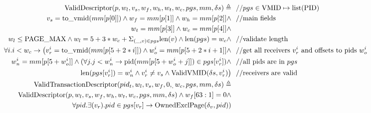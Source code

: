 \documentclass[a4paper]{article}
\newcommand*{\defined}{\triangleq}
\newcommand*{\PID}{\text{PID}}
\newcommand*{\VMID}{\text{VMID}}
\newcommand*{\PPMAX}{\text{PAGE\_MAX}}
\begin{document}
\clearpage

\begin{align*}
  \text{ValidDescriptor}(p,w_l,v_s,w_f,w_h,w_t,w_c,pgs,mm,\delta s)\defined &~~//pgs \in \VMID \mapsto \text{list}(\PID)\\
  v_{s}=\tv{mm[p[0]]} \land w_{f}=mm[p[1]] \land w_{h}=mm[p[2]] \land &~~//\text{main fields}\\
   w_{t} = mm[p[3]] \land w_{c} = mm[p[4]] \land &~~ \\
  w_l \le \PPMAX \land w_{l} = 5+3*w_{c} + \Sigma_{(\_,v)\in pgs} \text{len}(v) \land \text{len}(pgs)=w_{c} \land &~~//\text{validate length} \\
  \forall i. i < w_{c}\rightarrow \big(v_{r}^{i}=\tv{mm[p[5+2*i]]} \land w_{o}^{i} = mm[p[5+2*i+1]] \land &~~//\text{get all receivers $v_{r}^{i}$ and offsets to pids $w_{o}^{i}$ }\\
  w_{n}^{i}=mm[p[5+w_{o}^{i}]] \land (\forall j. j < w_{n}^{i}\rightarrow \text{pid}(mm[p[5+w_{o}^{i}+j]])\in pgs[v_{r}^{i}]) \land&~~//\text{all pids are in $pgs$}\\
  \text{len}(pgs[v_{r}^{i}])=w_{n}^{i}\land v_{r}^{i}\ne v_{s} \land \text{ValidVMID}(\delta s,v_{r}^{i})\big) &~~//\text{receivers are valid}
  \\
  \text{ValidTransactionDescriptor}(pid_t,w_l,v_{s},w_f,0,_,w_c,pgs,mm,\delta s) \defined & \\
  \text{ValidDescriptor}(p,w_l,v_s,w_f,w_h,w_t,w_c,pgs,mm,\delta s) \land w_f[63:1] = 0 \land& \\
   \forall pid. \exists (v_{r}). pid \in pgs[v_{r}] \rightarrow \text{OwnedExclPage}(\delta_v, pid))
  \end{align*}
\end{document}
